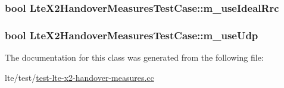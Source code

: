 \subsubsection[{\texorpdfstring{m\+\_\+use\+Ideal\+Rrc}{m_useIdealRrc}}]{\setlength{\rightskip}{0pt plus 5cm}bool Lte\+X2\+Handover\+Measures\+Test\+Case\+::m\+\_\+use\+Ideal\+Rrc\hspace{0.3cm}{\ttfamily [private]}}\hypertarget{classLteX2HandoverMeasuresTestCase_a79b9c697557a4e8f4ee6b8f777229b5e}{}\label{classLteX2HandoverMeasuresTestCase_a79b9c697557a4e8f4ee6b8f777229b5e}
\subsubsection[{\texorpdfstring{m\+\_\+use\+Udp}{m_useUdp}}]{\setlength{\rightskip}{0pt plus 5cm}bool Lte\+X2\+Handover\+Measures\+Test\+Case\+::m\+\_\+use\+Udp\hspace{0.3cm}{\ttfamily [private]}}\hypertarget{classLteX2HandoverMeasuresTestCase_a5a6facbcae0302e2c0ec63ed14e20301}{}\label{classLteX2HandoverMeasuresTestCase_a5a6facbcae0302e2c0ec63ed14e20301}


The documentation for this class was generated from the following file\+:\begin{DoxyCompactItemize}
\item 
lte/test/\hyperlink{test-lte-x2-handover-measures_8cc}{test-\/lte-\/x2-\/handover-\/measures.\+cc}\end{DoxyCompactItemize}
